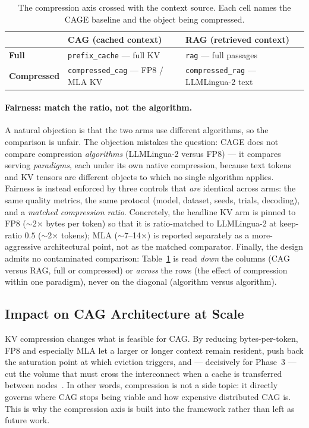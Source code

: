 \documentclass[12pt,a4paper]{article}
\let\cite\citep
\begin{document}
\begin{table}[H]
\centering
\caption{The compression axis crossed with the context source. Each cell names the
CAGE baseline and the object being compressed.}
\label{tab:compression}
\footnotesize
\begin{tabular}{@{}lll@{}}
\toprule
 & \textbf{CAG (cached context)} & \textbf{RAG (retrieved context)} \\
\midrule
\textbf{Full} & \texttt{prefix\_cache} --- full KV & \texttt{rag} --- full passages \\
\textbf{Compressed} & \texttt{compressed\_cag} --- FP8 / MLA KV & \texttt{compressed\_rag} --- LLMLingua-2 text \\
\bottomrule
\end{tabular}
\end{table}

\paragraph{Fairness: match the ratio, not the algorithm.} A natural objection is
that the two arms use different algorithms, so the comparison is unfair. The
objection mistakes the question: CAGE does not compare compression \emph{algorithms}
(LLMLingua-2 versus FP8) --- it compares serving \emph{paradigms}, each under its
own native compression, because text tokens and KV tensors are different objects to
which no single algorithm applies. Fairness is instead enforced by three controls
that \emph{are} identical across arms: the same quality metrics, the same protocol
(model, dataset, seeds, trials, decoding), and a \emph{matched compression ratio}.
Concretely, the headline KV arm is pinned to FP8 ($\sim$2$\times$ bytes per token)
so that it is ratio-matched to LLMLingua-2 at keep-ratio $0.5$ ($\sim$2$\times$
tokens); MLA ($\sim$7--14$\times$) is reported separately as a more-aggressive
architectural point, not as the matched comparator. Finally, the design admits no
contaminated comparison: Table~\ref{tab:compression} is read \emph{down} the columns
(CAG versus RAG, full or compressed) or \emph{across} the rows (the effect of
compression within one paradigm), never on the diagonal (algorithm versus
algorithm).

\subsection{Impact on CAG Architecture at Scale}

KV compression changes what is feasible for CAG. By reducing bytes-per-token, FP8
and especially MLA let a larger or longer context remain resident, push back the
saturation point at which eviction triggers, and --- decisively for Phase~3 --- cut
the volume that must cross the interconnect when a cache is transferred between
nodes~\cite{deepseekv2, lmcache}. In other words, compression is not a side topic:
it directly governs where CAG stops being viable and how expensive distributed CAG
is. This is why the compression axis is built into the framework rather than left
as future work.
\end{document}
